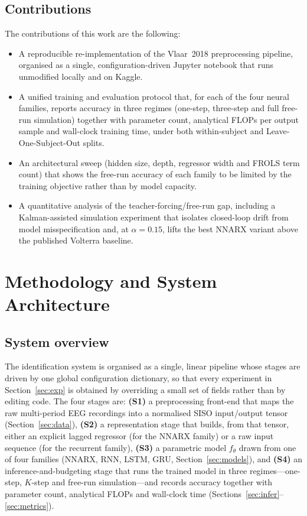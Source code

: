 \documentclass[10pt,twocolumn,letterpaper]{article}
\newcommand{\cfgdriven}{con\-fig\-u\-ra\-tion-driven}
\begin{document}
\subsection{Contributions}
The contributions of this work are the following:
\begin{itemize}
    \item A reproducible re-implementation of the Vlaar~2018
          preprocessing pipeline, organised as a single,
          \cfgdriven{} Jupyter notebook that runs unmodified
          locally and on Kaggle.
    \item A unified training and evaluation protocol that, for each of
          the four neural families, reports accuracy in three regimes
          (one-step, three-step and full free-run simulation) together
          with parameter count, analytical FLOPs per output sample and
          wall-clock training time, under both within-subject and
          Leave-One-Subject-Out splits.
    \item An architectural sweep (hidden size, depth, regressor width
          and FROLS term count) that shows the free-run accuracy of each
          family to be limited by the training objective rather than by
          model capacity.
    \item A quantitative analysis of the teacher-forcing/free-run gap,
          including a Kalman-assisted simulation experiment that
          isolates closed-loop drift from model misspecification and, at
          $\alpha=0.15$, lifts the best NNARX variant above the
          published Volterra baseline.
\end{itemize}

\section{Methodology and System Architecture}\label{sec:method}

\subsection{System overview}\label{sec:overview}
The identification system is organised as a single, linear pipeline whose
stages are driven by one global configuration dictionary, so that every
experiment in Section~\ref{sec:exp} is obtained by overriding a small set
of fields rather than by editing code. The four stages are: \textbf{(S1)}
a preprocessing front-end that maps the raw multi-period EEG recordings
into a normalised SISO input/output tensor (Section~\ref{sec:data}),
\textbf{(S2)} a representation stage that builds, from that tensor, either
an explicit lagged regressor (for the NNARX family) or a raw input
sequence (for the recurrent family), \textbf{(S3)} a parametric model
$f_\theta$ drawn from one of four families (NNARX, RNN, LSTM, GRU,
Section~\ref{sec:models}), and \textbf{(S4)} an inference-and-budgeting
stage that runs the trained model in three regimes---one-step, $K$-step
and free-run simulation---and records accuracy together with parameter
count, analytical FLOPs and wall-clock time
(Sections~\ref{sec:infer}--\ref{sec:metrics}).
\end{document}
